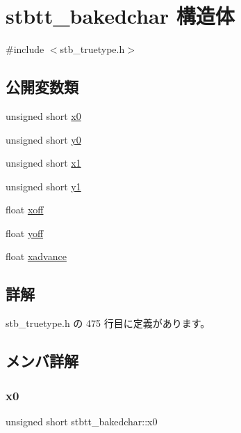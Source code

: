 \hypertarget{structstbtt__bakedchar}{}\section{stbtt\+\_\+bakedchar 構造体}
\label{structstbtt__bakedchar}


{\ttfamily \#include $<$stb\+\_\+truetype.\+h$>$}

\subsection*{公開変数類}
\begin{DoxyCompactItemize}
\item 
unsigned short \mbox{\hyperlink{structstbtt__bakedchar_a8011a0ed0410de9fa405c9cb1ab43da2}{x0}}
\item 
unsigned short \mbox{\hyperlink{structstbtt__bakedchar_aec4def12c086e0038ba32ff33ee78644}{y0}}
\item 
unsigned short \mbox{\hyperlink{structstbtt__bakedchar_a72c22c32abde95a5ba02925b8bd892bf}{x1}}
\item 
unsigned short \mbox{\hyperlink{structstbtt__bakedchar_ac831dc667f6c39b5d22740c6cbd5bc3f}{y1}}
\item 
float \mbox{\hyperlink{structstbtt__bakedchar_a0708a6588a2768b68a3ae59002944b7c}{xoff}}
\item 
float \mbox{\hyperlink{structstbtt__bakedchar_aba01393e52d1c6f4ce86a8b51e498bb4}{yoff}}
\item 
float \mbox{\hyperlink{structstbtt__bakedchar_ad77b35d1a849d9eb7edb91df05b10536}{xadvance}}
\end{DoxyCompactItemize}


\subsection{詳解}


 stb\+\_\+truetype.\+h の 475 行目に定義があります。



\subsection{メンバ詳解}
\mbox{\label{structstbtt__bakedchar_a8011a0ed0410de9fa405c9cb1ab43da2}} 
\subsubsection{\texorpdfstring{x0}{x0}}
{\footnotesize\ttfamily unsigned short stbtt\+\_\+bakedchar\+::x0}



